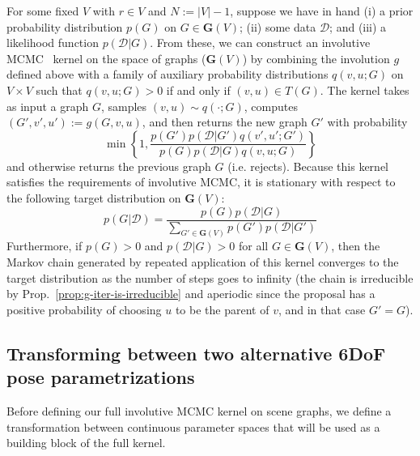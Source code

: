 For some fixed $V$ with $r \in V$ and $N := |V|-1$, suppose we have in hand (i) a prior probability distribution $p(G)$ on $G \in \mathbf{G}(V)$; (ii) some data $\mathcal{D}$; and (iii) a likelihood function $p(\mathcal{D} | G)$.
From these, we can construct an involutive MCMC~\citep{cusumano2020automating} kernel on the space of graphs ($\mathbf{G}(V)$) by combining the involution $g$ defined above with
a family of auxiliary probability distributions $q(v, u; G)$ on $V \times V$ such that $q(v, u; G) > 0$ if and only if $(v, u) \in T(G)$.
The kernel takes as input a graph $G$, samples $(v, u) \sim q(\cdot; G)$, computes $(G', v', u') := g(G, v, u)$, and then returns the new graph $G'$ with probability
\begin{equation}
\min\left\{
1, \frac{p(G') p(\mathcal{D} | G') q(v', u'; G') }{p(G) p(\mathcal{D} | G) q(v, u; G)}
\right\}
\end{equation}
and otherwise returns the previous graph $G$ (i.e. rejects).
Because this kernel satisfies the requirements of involutive MCMC, it is stationary with respect to the following target distribution on $\mathbf{G}(V)$:
\begin{equation}
p(G | \mathcal{D}) = \frac{p(G) p(\mathcal{D} | G)}{\sum_{G' \in \mathbf{G}(V)} p(G') p(\mathcal{D} | G')}
\end{equation}
Furthermore, if $p(G) > 0$ and $p(\mathcal{D} | G) > 0$ for all $G \in \mathbf{G}(V)$, then the Markov chain generated by repeated application of this kernel converges to the target distribution as the number of steps goes to infinity
(the chain is irreducible by Prop.~\ref{prop:g-iter-is-irreducible} and aperiodic since the proposal has a positive probability of choosing $u$ to be the parent of $v$, and in that case $G' = G$).

\subsection{Transforming between two alternative 6DoF pose parametrizations} \label{sec:two_orientation_descr}
Before defining our full involutive MCMC kernel on scene graphs,
we define a transformation between continuous parameter spaces that
will be used as a building block of the full kernel.

